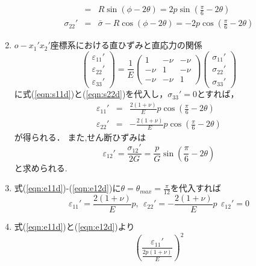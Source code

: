 \documentclass[10pt,a4j]{jarticle}
\begin{document}
\begin{enumerate}
\begin{eqnarray}
		&=& R \sin \left( \phi- 2\theta \right)
		= 2p \sin \left( \frac{\pi}{6}-2\theta\right) 
		\label{eqn:s12d}
		\\
		\sigma_{22}'
		&=&\bar \sigma -R \cos \left( \phi- 2\theta \right)
		= -2p \cos \left( \frac{\pi}{6}-2\theta\right) 
		\label{eqn:s22d}
	\end{eqnarray}
\item
	$o-x_1'x_2'$座標系における直ひずみと直応力の関係
	\begin{equation}
		\left(
		\begin{array}{c}
			\varepsilon_{11}' \\
			\varepsilon_{22}' \\
			\varepsilon_{33}'
		\end{array}
		\right)
		=
		\frac{1}{E}
		\left(
		\begin{array}{ccc}
			1 & -\nu & -\nu \\
			-\nu & 1 & -\nu \\
			-\nu & -\nu & 1 
		\end{array}
		\right)
		\left(
		\begin{array}{c}
			\sigma_{11}' \\
			\sigma_{22}' \\
			\sigma_{33}'
		\end{array}
		\right)
		\label{eqn:Hooke_d}
	\end{equation}
	に式(\ref{eqn:s11d})と(\ref{eqn:s22d})を代入し，$\sigma_{33}'=0$とすれば，
	\begin{eqnarray}
		\varepsilon_{11}'&=&\frac{2(1+\nu)}{E}p\cos\left(\frac{\pi}{6}-2\theta\right) 
		\label{eqn:e11d}
		\\ 
		\varepsilon_{22}'&=&-\frac{2(1+\nu)}{E}p\cos\left(\frac{\pi}{6}-2\theta\right) 
		\label{eqn:e22d}
	\end{eqnarray}
	が得られる．
	また,せん断ひずみは
	\begin{equation}
		\varepsilon_{12}'=\frac{\sigma_{12}'}{2G}=\frac{p}{G}\sin\left(\frac{\pi}{6}-2\theta \right)
		\label{eqn:e12d}
	\end{equation}
	と求められる.
\item
	式(\ref{eqn:e11d})-(\ref{eqn:e12d})に$\theta=\theta_{max}=\frac{\pi}{12}$を代入すれば
	\[
		\varepsilon_{11}'=\frac{2(1+\nu)}{E} p,
		\ \ 
		\varepsilon_{22}'=-\frac{2(1+\nu)}{E} p
		\ \ 
		\varepsilon_{12}'=0
	\]
\item
	式(\ref{eqn:e11d})と(\ref{eqn:e12d})より
	\begin{equation}
		\left( \frac{\varepsilon_{11}'}{\frac{2p(1+\nu)}{E}}\right)^2 

\end{equation}
\end{enumerate}
\end{document}
